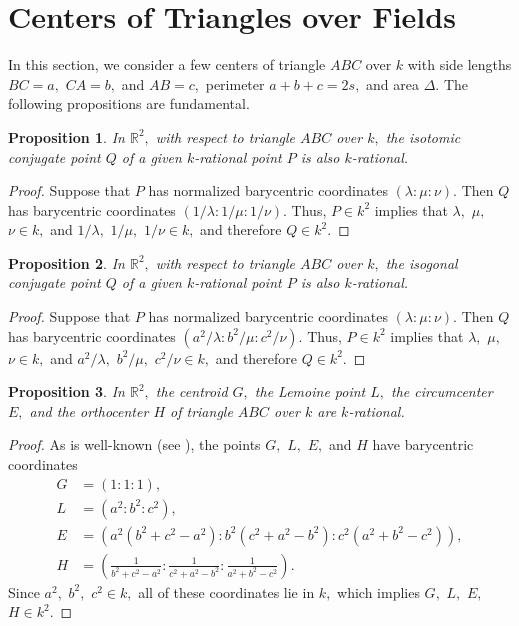 \documentclass{article}
\theoremstyle{definition}
\theoremstyle{plain}
\newtheorem{prop}{Proposition}
\newenvironment{pf}{\begin{proof}}{\end{proof}}
\begin{document}
\section{Centers of Triangles over Fields}\label{sec-trig}
In this section, we consider a few centers of triangle $ABC$ over $k$ with side lengths $BC = a,$ $CA = b,$ and $AB = c,$ perimeter $a+b+c = 2s,$ and area $\Delta.$ 
The following propositions are fundamental.
\begin{prop}\label{prop-isom}
In $\mathbb R^2,$ with respect to triangle $ABC$ over $k,$ the isotomic conjugate point $Q$ of a given $k$-rational point $P$ is also $k$-rational.
\end{prop}
\begin{pf}
Suppose that $P$ has normalized barycentric coordinates $(\lambda :\mu :\nu ).$ 
Then $Q$ has barycentric coordinates $(1/\lambda :1/\mu :1/\nu ).$ 
Thus, $P \in k^2$ implies that $\lambda,$ $\mu,$ $\nu \in k,$ and $1/\lambda,$ $1/\mu,$ $1/\nu \in k,$ and therefore $Q \in k^2.$
\end{pf}
\begin{prop}\label{prop-isog}
In $\mathbb R^2,$ with respect to triangle $ABC$ over $k,$ the isogonal conjugate point $Q$ of a given $k$-rational point $P$ is also $k$-rational.
\end{prop}
\begin{pf}
Suppose that $P$ has normalized barycentric coordinates $(\lambda :\mu :\nu ).$ 
Then $Q$ has barycentric coordinates $(a^2/\lambda :b^2/\mu :c^2/\nu ).$ 
Thus, $P \in k^2$ implies that $\lambda,$ $\mu,$ $\nu \in k,$ and $a^2/\lambda,$ $b^2/\mu,$ $c^2/\nu \in k,$ and therefore $Q \in k^2.$
\end{pf}
\begin{prop}
In $\mathbb R^2,$ the centroid $G,$ the Lemoine point $L,$ the circumcenter $E,$ and the orthocenter $H$ of triangle $ABC$ over $k$ are $k$-rational.
\end{prop}
\begin{pf}
As is well-known (see \cite{ETC}), the points $G,$ $L,$ $E,$ and $H$ have barycentric coordinates 
\begin{align*} 
G &= (1:1:1), \\ 
L &= (a^2:b^2:c^2), \\ 
E &= (a^2(b^2+c^2-a^2):b^2(c^2+a^2-b^2):c^2(a^2+b^2-c^2)), \\ 
H &= \left(\frac{1}{b^2+c^2-a^2}:\frac{1}{c^2+a^2-b^2}:\frac{1}{a^2+b^2-c^2}\right). 
\end{align*} 
Since $a^2,$ $b^2,$ $c^2 \in k,$ all of these coordinates lie in $k,$ which implies $G,$ $L,$ $E,$ $H \in k^2.$
\end{pf}
\end{document}
